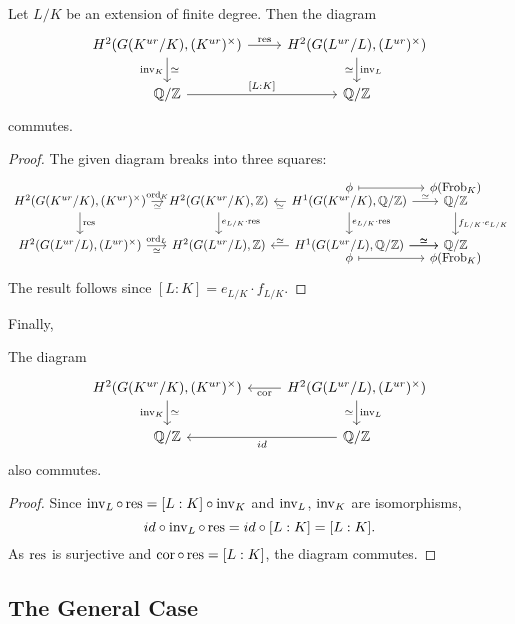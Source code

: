 \documentclass[class=article, crop=false]{standalone}
\begin{document}
\begin{proposition} \label{prop:br:res}
	Let $L/K$ be an extension of finite degree. Then the diagram
	\[
	\begin{tikzcd}
		H^{2}(G(K^{ur}/K),(K^{ur})^{\times})\ar{r}{\res}\ar[d,"\inv_K"',"\simeq"] & H^{2}(G(L^{ur}/L),(L^{ur})^{\times})\ar[d,"\inv_L","\simeq"']\\
		\QQ/\ZZ\ar{r}{[L:K]} & \QQ/\ZZ
	\end{tikzcd}
	\] 
	commutes.
\end{proposition}
\begin{proof}
	The given diagram breaks into three squares:
	\[
	\begin{tikzcd}[column sep=1em]
		&&\phi\ar[r,mapsto] & \phi(\Frob_K)\\[-25pt]
		H^2(G(K^{ur}/K),(K^{ur})^{\times})\ar[r,"\ord_K","\simeq"']\ar[d,"\res"] & H^2(G(K^{ur}/K),\ZZ)\ar[d,"e_{L/K}\cdot\res"] & H^{1}(G(K^{ur}/K),\QQ/\ZZ)\ar[l,"\simeq"]\ar[d,"e_{L/K}\cdot\res"]\ar[r,"\simeq"]& \QQ/\ZZ\ar[d,"f_{L/K}\cdot e_{L/K}"]\\
		H^{2}(G(L^{ur}/L),(L^{ur})^{\times})\ar[r,"\ord_L","\simeq"'] & H^2(G(L^{ur}/L),\ZZ) & H^{1}(G(L^{ur}/L),\QQ/\ZZ)\ar[l,"\simeq"']\ar[r,"\simeq"]\ar[r,"\simeq"] & \QQ/\ZZ\\[-25pt]
		&&\phi\ar[r,mapsto] & \phi(\Frob_K)
	\end{tikzcd}
	\] 
	The result follows since $[L:K]=e_{L/K}\cdot f_{L/K}$.
\end{proof}
Finally,
\begin{corollary} \label{prop:br:cores}
	The diagram
	\[
	\begin{tikzcd}
		H^{2}(G(K^{ur}/K),(K^{ur})^{\times})\ar[d,"\inv_K"',"\simeq"] & H^{2}(G(L^{ur}/L),(L^{ur})^{\times})\ar[l,"\cor"]\ar[d,"\inv_L","\simeq"']\\
		\QQ/\ZZ & \QQ/\ZZ\ar[l,"id"]
	\end{tikzcd}
	\] 
	also commutes.
\end{corollary}
\begin{proof}
	Since $\operatorname{inv}_L\circ\operatorname{res}=[L:K]\circ\operatorname{inv}_K$ and $\operatorname{inv}_L$, $\operatorname{inv}_K$ are isomorphisms,
	\[
		id\circ\operatorname{inv}_L\circ\operatorname{res}=id\circ[L:K]=[L:K]
	.\] 
	As $\operatorname{res}$ is surjective and $\operatorname{cor}\circ\operatorname{res}=[L:K]$, the diagram commutes.
\end{proof}

\subsection{The General Case}
\end{document}
